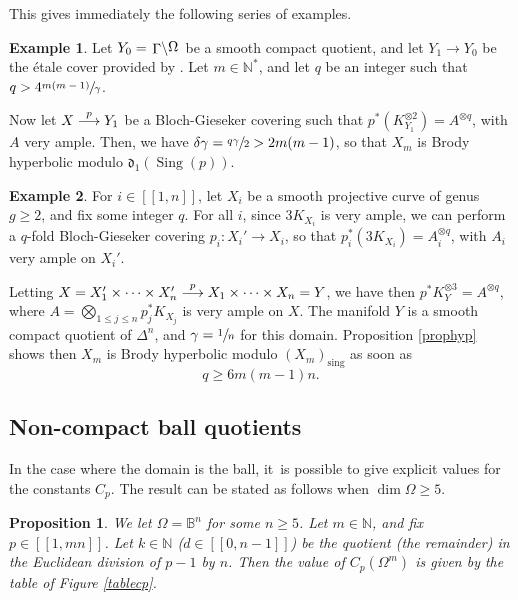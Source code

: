 \documentclass[JEP,XML,SOM,Unicode, NoEqCountersInSection,NoFloatCountersInSection,published]{cedram}
\def\To#1{\mathchoice{\xrightarrow{\textstyle\kern4pt#1\kern3pt}}{\stackrel{#1}{\longrightarrow}}{}{}}
\newcommand{\llbracket}{[\![}
\newcommand{\rrbracket}{]\!]}
\newcommand{\sing}{\mathrm{sing}}
\DeclareMathOperator{\Sing}{Sing}
\theoremstyle{theorem}
\newtheorem{proposition}{Proposition} [section]
\theoremstyle{definition}
\newtheorem{example}{Example}
\newcommand{\quotient}[2]{{\left.\raisebox{-.08em}{$#1$}\middle\backslash\raisebox{.08em}{$#2$}\right.}}
\begin{document}
This gives immediately the following series of examples.

\begin{example}
Let $Y_0 = \quotient{\Gamma}{\Omega}$ be a smooth compact quotient, and let $Y_1 \to Y_0$ be the étale cover provided by \cite{HwT00}. Let $m \in \mathbb N^\ast$, and let $q$ be an integer such that $q > 4 \sfrac{m (m-1)}{\gamma}$.

Now let $X\To{p} Y_1$ be a Bloch-Gieseker covering such that $p^\ast(K_{Y_1}^{\otimes 2}) = A^{\otimes q}$, with $A$ very ample. Then, we have $\delta \gamma = \sfrac{q \gamma}{2} > 2 m (m - 1)$, so that $X_m$ is Brody hyperbolic modulo $\mathfrak{d}_1(\Sing(p))$.
\end{example}

\begin{example} For $i\in\llbracket1,n\rrbracket$, let $X_i$ be a smooth projective curve of genus $g \geq 2$, and fix some integer $q$. For all $i$, since $3 K_{X_i}$ is very ample, we can perform a $q$-fold Bloch-Gieseker covering $p_i : X_i' \to X_i$, so that $p_i^\ast (3 K_{X_i}) = A_i^{\otimes q}$, with $A_i$ very ample on $X_i'$.

Letting $X = X_1' \times \cdots \times X_n' \To{p} X_1 \times \cdots \times X_n = Y$, we have then $p^\ast K_Y^{\otimes 3} = A^{\otimes q}$, where $A = \bigotimes_{1 \leq j \leq n} p_j^\ast K_{X_j}$ is very ample on $X$. The manifold $Y$ is a smooth compact quotient of $\Delta^n$, and $\gamma = \sfrac{1}{n}$ for this domain. Proposition \ref{prophyp} shows then $X_m$ is Brody hyperbolic modulo $(X_m)_{\sing}$ as soon as
\[
q \geq 6 m (m - 1) n.
\]
\end{example}

\subsection{Non-compact ball quotients} In the case where the domain is the ball, it~is possible to give explicit values for the constants $C_p$. The result can be stated as follows when $\dim \Omega \geq 5$.

\begin{proposition} \label{propCpball}
We let $\Omega = \mathbb B^n$ for some $n \geq 5$. Let $m \in \mathbb N$, and fix $p \in \llbracket 1, mn \rrbracket$. Let $k \in \mathbb N$ (\resp $d \in \llbracket 0, n-1\rrbracket$) be the quotient (\resp the remainder) in the Euclidean division of $p-1$ by $n$. Then the value of $C_p(\Omega^m)$ is given by the table of Figure \ref{tablecp}.
\end{proposition}
\end{document}
